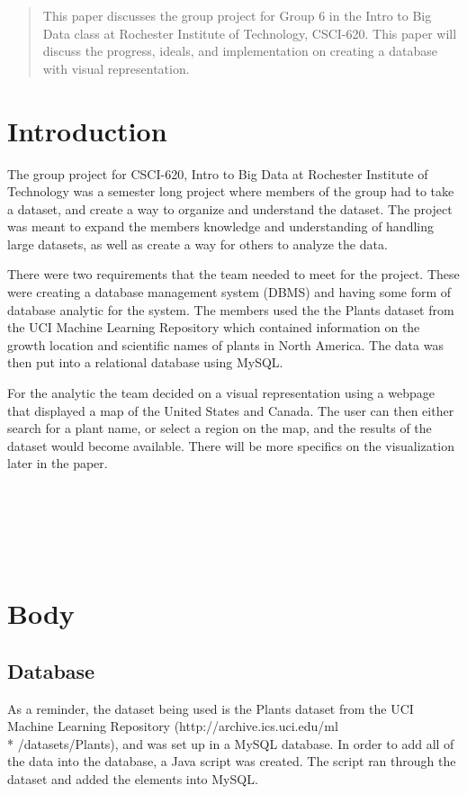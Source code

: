 \documentclass{Group6_Phase2}
\begin{document}
\maketitle
\begin{abstract}
This paper discusses the group project for Group 6 in the Intro to Big Data class at Rochester Institute of Technology, CSCI-620. This paper will discuss the progress, ideals, and implementation on creating a database with visual representation.
\end{abstract}


\section{Introduction}
The group project for CSCI-620, Intro to Big Data at Rochester Institute of Technology was a semester long project where members of the group had to take a dataset, and create a way to organize and understand the dataset. The project was meant to expand the members knowledge and understanding of handling large datasets, as well as create a way for others to analyze the data.

There were two requirements that the team needed to meet for the project. These were creating a database management system (DBMS) and having some form of database analytic for the system. The members used the the Plants dataset from the UCI Machine Learning Repository which contained information on the growth location and scientific names of plants in North America. The data was then put into a relational database using  MySQL. 

For the analytic the team decided on a visual representation using a webpage that displayed a map of the United States and Canada. The user can then either search for a plant name, or select a region on the map, and the results of the dataset would become available. There will be more specifics on the visualization later in the paper.  
\\\\\\\\\\\\

\section{Body}

\subsection{Database}
 As a reminder, the dataset being used is the Plants dataset from the UCI Machine Learning Repository (http://archive.ics.uci.edu/ml \\* /datasets/Plants), and was set up in a MySQL database. In order to add all of the data into the database, a Java script was created. The script ran through the dataset and added the elements into MySQL. 
 
\end{document}
